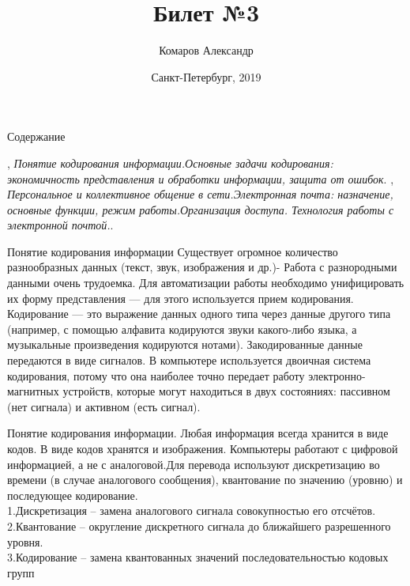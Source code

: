 \documentclass{beamer}
\begin{document}
\title{Билет №3}  
\author{Комаров Александр}
\date{Санкт-Петербург, 2019} 
\frame{\titlepage} 
\begin{frame}{Содержание}
 \begin{thebibliography}{10}
\beamertemplatebookbibitems
{}
{}, {\em Понятие кодирования информации.Основные задачи кодирования: экономичность представления и обработки информации, защита от ошибок}.
{}, {\em Персональное и коллективное общение в сети.Электронная почта: назначение, основные функции, режим работы.Организация доступа. Технология работы с электронной почтой.}.
\end{thebibliography}
\end{frame}

\begin{frame}{Понятие кодирования информации}
Существует огромное количество разнообразных данных (текст, звук, изображения и др.)- Работа с разнородными данными очень трудоемка. Для автоматизации работы необходимо унифицировать их форму представления — для этого используется прием кодирования.
Кодирование — это выражение данных одного типа через данные другого типа (например, с помощью алфавита кодируются звуки какого-либо языка, а музыкальные произведения кодируются нотами). Закодированные данные передаются в виде сигналов. В компьютере используется двоичная система кодирования, потому что она наиболее точно передает работу электронно-магнитных устройств, которые могут находиться в двух состояниях: пассивном (нет сигнала) и активном (есть сигнал). 
\end{frame}

\begin{frame}{Понятие кодирования информации.}
Любая информация всегда хранится в виде кодов. В виде кодов хранятся и изображения.
Компьютеры работают с цифровой информацией, а не с аналоговой.Для перевода используют дискретизацию во времени (в случае аналогового сообщения), квантование по значению (уровню) и последующее кодирование.\\
1.Дискретизация – замена аналогового сигнала совокупностью его отсчётов.\\
2.Квантование – округление дискретного сигнала до ближайшего разрешенного уровня.\\
3.Кодирование – замена квантованных значений последовательностью кодовых групп
\end{frame}
\end{document}
